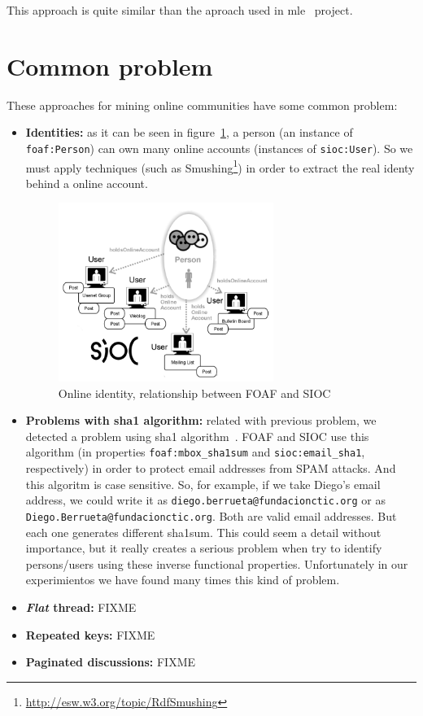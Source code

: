 \documentclass{../templates/www2008-submission}
\begin{document}
This approach is quite similar than the aproach used in mle~\cite{Hausenblas2007}
project.


\section{Common problem}

These approaches for mining online communities have some common problem:

\begin{itemize}
  \item \textbf{Identities:} as it can be seen in figure~\ref{fig:foaf-sioc},
	a person (an instance of \texttt{foaf:Person}) can own many online 
	accounts (instances of \texttt{sioc:User}). So we must apply techniques
	(such as Smushing\footnote{\url{http://esw.w3.org/topic/RdfSmushing}})
	in order to extract the real identy behind a online account.

	\begin{figure}[ht]
	 \centering
	 \includegraphics[width=7cm]{images/foaf-sioc.png}
	 \caption{\label{fig:foaf-sioc}Online identity, relationship between FOAF and SIOC}
	\end{figure}

  \item \textbf{Problems with sha1 algorithm:} related with previous problem,
	we detected a problem using sha1 algorithm~\cite{Eastlake2001}. FOAF 
	and SIOC use this algorithm (in properties \texttt{foaf:mbox\_sha1sum} 
	and \texttt{sioc:email\_sha1}, respectively) in order to protect email 
	addresses from SPAM attacks. And this algoritm is case sensitive. So,
	for example, if we take Diego's email address, we could write it as
	\texttt{diego.berrueta@fundacionctic.org} or as \texttt{Diego.Berrueta@fundacionctic.org}.
	Both are valid email addresses. But each one generates different sha1sum.
	This could  seem a detail without importance, but it really creates a 
	serious problem when try to identify persons/users using these
	inverse functional properties. Unfortunately in our experimientos we 
	have found many times this kind of problem.

  \item \textbf{\textit{Flat} thread:} FIXME

  \item \textbf{Repeated keys:} FIXME

  \item \textbf{Paginated discussions:} FIXME


\end{itemize}
\end{document}
